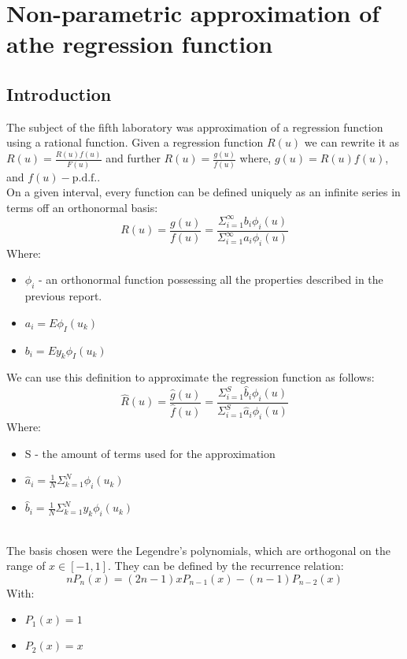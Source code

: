 \chapter{Non-parametric approximation of athe regression function}
\section{Introduction}

The subject of the fifth laboratory was approximation of a regression function using a rational function.
Given a regression function $R(u)$ we can rewrite it as  $R(u) = \frac{R(u)f(u)}{F(u)}$ and further $R(u) = \frac{g(u)}{f(u)}$ where, $g(u) = R(u)f(u)$, and  $f(u) - \text{p.d.f.}$. \\
On a given interval, every function can be defined uniquely as an infinite series in terms off an orthonormal basis:
\begin{equation}
    R(u) = \frac{g(u)}{f(u)} = \frac{\Sigma_{i=1}^{\infty}b_i\phi_i(u)}{ \Sigma_{i=1}^{\infty}a_i\phi_i(u)}
\end{equation}
Where:
\begin{itemize}
        \item $\phi_i$ - an orthonormal function possessing all the properties described in the previous report.
        \item $a_i = E\phi_I(u_k)$
        \item $b_i = E y_k\phi_I(u_k)$
\end{itemize}
We can use this definition to approximate the regression function as follows:
\begin{equation}
    \hat{R}(u) = \frac{\hat{g}(u)}{\hat{f}(u)} =   \frac{\Sigma_{i=1}^{S}\hat{b}_i\phi_i(u)}{ \Sigma_{i=1}^{S}\hat{a}_i\phi_i(u)}
\end{equation}
Where:
\begin{itemize}
        \item S - the amount of terms used for the approximation
        \item $\hat{a}_i = \frac{1}{N} \Sigma_{k=1}^{N}\phi_i(u_k)$
        \item $\hat{b}_i = \frac{1}{N} \Sigma_{k=1}^{N}y_k\phi_i(u_k)$
\end{itemize}
\\
\clearpage
The basis chosen were the Legendre's polynomials, which are orthogonal on the range of $x \in [-1,1]$.
They can be defined by the recurrence relation:
\begin{equation}
    nP_{n}(x) = (2n-1)xP_{n-1}(x) - (n-1)P_{n-2}(x)
\end{equation}
With:
\begin{itemize}
    \item $P_1(x)=1$
    \item $P_2(x) = x$
\end{itemize}

